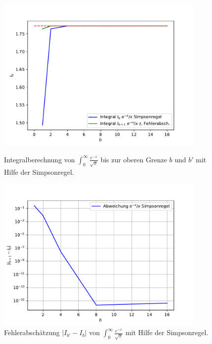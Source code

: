 \begin{figure}[h!]
\begin{minipage}{0.45\textwidth}
\includegraphics[width=0.9\textwidth]{A1/build/1b.pdf}
\caption{Integralberechnung von $\int_0^{\infty}\frac{e^{-x}}{\sqrt{x}}$ bis zur oberen Grenze $b$ und $b'$ mit Hilfe der Simpsonregel.}
\label{fig:1b}
\end{minipage}
\begin{minipage}{0.45\textwidth}
\includegraphics[width=0.9\textwidth]{A1/build/1b_err.pdf}
\caption{Fehlerabschätzung $|I_{b'}-I_b|$ von $\int_0^{\infty}\frac{e^{-x}}{\sqrt{x}}$ mit Hilfe der Simpsonregel.}
\label{fig:1b_err}
\end{minipage}
\end{figure}

